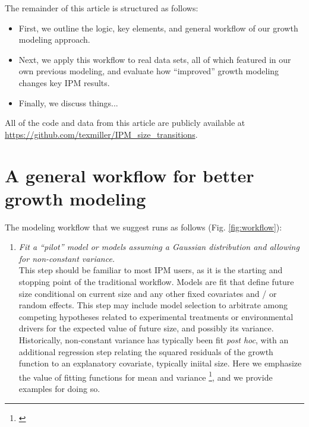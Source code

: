 \documentclass[11pt]{article}
\newcommand{\tom}[2]{{\color{red}{#1}}\footnote{\textit{\color{red}{#2}}}}
\begin{document}
{The remainder of this article is structured as follows:
\begin{itemize}
\item First, we outline the logic, key elements, and general workflow of our growth modeling approach.
\item Next, we apply this workflow to real data sets, all of which featured in our own previous modeling, and evaluate how ``improved'' growth modeling changes key IPM results.
\item Finally, we discuss things...
\end{itemize}
All of the code and data from this article are publicly available at \url{https://github.com/texmiller/IPM_size_transitions}.

\section{A general workflow for better growth modeling}

The modeling workflow that we suggest runs as follows (Fig. \ref{fig:workflow}):
\begin{enumerate}
\item \textit{Fit a ``pilot'' model or models assuming a Gaussian distribution and allowing for non-constant variance.}
\\ 
This step should be familiar to most IPM users, as it is the starting and stopping point of the traditional workflow. 
Models are fit that define future size conditional on current size and any other fixed covariates and / or random effects. 
This step may include model selection to arbitrate among competing hypotheses related to experimental treatments or environmental drivers for the expected value of future size, and possibly its variance.
Historically, non-constant variance has typically been fit \textit{post hoc}, with an additional regression step relating the squared residuals of the growth function to an explanatory covariate, typically iniital size. 
Here we emphasize the value of fitting functions for mean and variance \tom{simultaneously}{In the cactus example, getting the variance right changes the rank of model selection for the mean. Not sure this is worth getting into.}, and we provide examples for doing so. 


\end{enumerate}}
\end{document}
